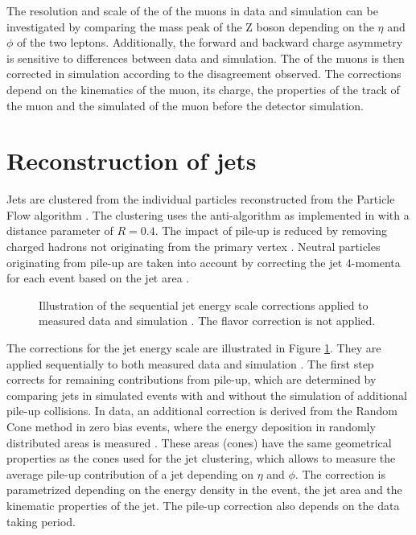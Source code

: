 The resolution and scale of the \pt of the muons in data and simulation can be investigated by comparing the mass peak of the Z boson depending on the $\eta$ and $\phi$ of the two leptons.
Additionally, the forward and backward charge asymmetry is sensitive to differences between data and simulation.
The \pt of the muons is then corrected in simulation according to the disagreement observed. The corrections depend on the kinematics of the muon, its charge, the properties of the track of the muon and the simulated \pt
of the muon before the detector simulation.

\section{Reconstruction of jets}
\label{sec:SimReco_jetReco}

Jets are clustered from the individual particles reconstructed from the Particle Flow algorithm \cite{CMS-PAS-JME-16-003}.
The clustering uses the anti-\kt algorithm \cite{Cacciari:2008gp} as implemented in \FASTJET \cite{Cacciari:2011ma} with a distance parameter of $R = 0.4$.
The impact of pile-up is reduced by removing charged hadrons not originating from the primary vertex \cite{CMS-PAS-JME-14-001}.
Neutral particles originating from pile-up are taken into account by correcting the jet 4-momenta for each event based on the jet area \cite{1126-6708-2008-04-005,CACCIARI2008119}.

\begin{figure}[htbp!]
  \begin{center}
\caption{Illustration of the sequential jet energy scale corrections applied to measured data and simulation \cite{Khachatryan:2016kdb}. The flavor correction is not applied.
  \label{fig:reco_jec}}
  \end{center}
\end{figure}


The corrections for the jet energy scale are illustrated in Figure \ref{fig:reco_jec}. They are applied sequentially to both measured data and simulation \cite{Khachatryan:2016kdb,CMS-PAS-JME-16-003}.
The first step corrects for remaining contributions from pile-up, which are determined by comparing jets in simulated events with and without the simulation of additional pile-up collisions.
In data, an additional correction is derived from the Random Cone method in zero bias events, where the energy deposition in randomly distributed areas is measured \cite{1748-0221-6-11-P11002}. These areas (cones) have the same geometrical properties as the cones used for the jet clustering, which allows to measure the average pile-up contribution of a jet depending on $\eta$ and $\phi$. The correction is parametrized depending on the energy density in the event, the jet area and the kinematic
properties of the jet. The pile-up correction also depends on the data taking period.

